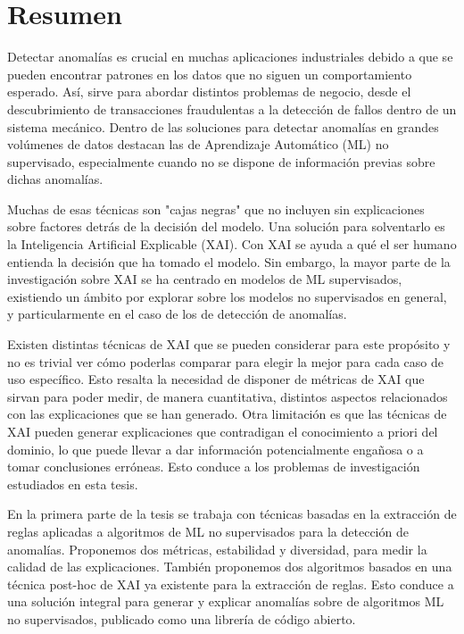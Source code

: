 \vspace*{15em}

\chapter*{Resumen}
Detectar anomalías es crucial en muchas aplicaciones industriales debido a que se pueden encontrar patrones en los datos que no siguen un comportamiento esperado. Así, sirve para abordar distintos problemas de negocio, desde el descubrimiento de transacciones fraudulentas a la detección de fallos dentro de un sistema mecánico. Dentro de las soluciones para detectar anomalías en grandes volúmenes de datos destacan las de Aprendizaje Automático (ML) no supervisado, especialmente cuando no se dispone de información previas sobre dichas anomalías.

Muchas de esas técnicas son "cajas negras" que no incluyen sin explicaciones sobre factores detrás de la decisión del modelo. Una solución para solventarlo es la Inteligencia Artificial Explicable (XAI). Con XAI se ayuda a qué el ser humano entienda la decisión que ha tomado el modelo. Sin embargo, la mayor parte de la investigación sobre XAI se ha centrado en modelos de ML supervisados, existiendo un ámbito por explorar sobre los modelos no supervisados en general, y particularmente en el caso de los de detección de anomalías.

Existen distintas técnicas de XAI que se pueden considerar para este propósito y no es trivial ver cómo poderlas comparar para elegir la mejor para cada caso de uso específico. Esto resalta la necesidad de disponer de métricas de XAI que sirvan para poder medir, de manera cuantitativa, distintos aspectos relacionados con las explicaciones que se han generado. Otra limitación es que las técnicas de XAI pueden generar explicaciones que contradigan el conocimiento a priori del dominio, lo que puede llevar a dar información potencialmente engañosa o a tomar conclusiones erróneas. Esto conduce a los problemas de investigación estudiados en esta tesis.

En la primera parte de la tesis se trabaja con técnicas basadas en la extracción de reglas aplicadas a
algoritmos de ML no supervisados para la detección de anomalías. Proponemos dos métricas, estabilidad y
diversidad, para medir la calidad de las explicaciones. También proponemos dos algoritmos basados en una técnica post-hoc de XAI ya existente para la extracción de reglas. Esto conduce a una solución integral para generar y explicar anomalías sobre de algoritmos ML no supervisados, publicado como una librería de código abierto.

